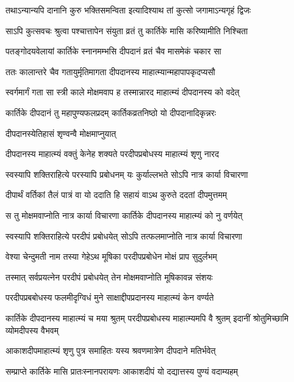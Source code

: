\twolineshloka
{तथाऽन्यान्यपि दानानि कुरु भक्तिसमन्विता}
{इत्यादिश्याथ तां कुत्सो जगामाऽन्यगृहं द्विजः} %

\twolineshloka
{साऽपि कुत्सवचः श्रुत्वा पश्चात्तापेन संयुता}
{व्रतं तु कार्तिके मासि करिष्यामीति निश्चिता} %

\twolineshloka
{पतङ्गोदयवेलायां कार्तिके स्नानमम्भसि}
{दीपदानं व्रतं चैव मासमेकं चकार सा} %

\twolineshloka
{ततः कालान्तरे चैव गतायुर्मृतिमागता}
{दीपदानस्य माहात्म्यान्महापापकृदप्यसौ} %

\twolineshloka
{स्वर्गमार्गं गता सा स्त्री काले मोक्षमवाप ह}
{तस्मान्नारद माहात्म्यं दीपदानस्य को वदेत्} %

\twolineshloka
{कार्तिके दीपदानं तु महापुण्यफलप्रदम्}
{कार्तिकव्रतनिष्ठो यो दीपदानादिकृन्नरः} %


\onelineshloka
{दीपदानस्येतिहासं शृण्वन्वै मोक्षमाप्नुयात्} %

\twolineshloka
{दीपदानस्य माहात्म्यं वक्तुं केनेह शक्यते}
{परदीपप्रबोधस्य माहात्म्यं शृणु नारद} %

\twolineshloka
{स्वस्यापि शक्तिराहित्ये परस्यापि प्रबोधनम्}
{यः कुर्याल्लभते सोऽपि नात्र कार्या विचारणा} %

\twolineshloka
{दीपार्थं वर्तिकां तैलं पात्रं वा यो ददाति हि}
{सहायं वाऽथ कुरुते ददतां दीपमुत्तमम्} %

\twolineshloka
{स तु मोक्षमवाप्नोति नात्र कार्या विचारणा}
{कार्तिके दीपदानस्य माहात्म्यं को नु वर्णयेत्} %

\twolineshloka
{स्वस्यापि शक्तिराहित्ये परदीपं प्रबोधयेत्}
{सोऽपि तत्फलमाप्नोति नात्र कार्या विचारणा} %

\twolineshloka
{वेश्या चेन्दुमती नाम तस्या गेहेऽथ मूषिका}
{परदीपप्रबोधेन मोक्षं प्राप सुदुर्लभम्} %

\twolineshloka
{तस्मात् सर्वप्रयत्नेन परदीपं प्रबोधयेत्}
{तेन मोक्षमवाप्नोति मूषिकावन्न संशयः} %

\twolineshloka
{परदीपप्रबबोधस्य फलमीदृग्विधं मुने}
{साक्षाद्दीपप्रदानस्य माहात्म्यं केन वर्ण्यते} %


\threelineshloka
{कार्तिके दीपदानस्य माहात्म्यं च मया श्रुतम्}
{परदीपप्रबोधस्य माहात्म्यमपि वै श्रुतम्}
{इदानीं श्रोतुमिच्छामि व्योमदीपस्य वैभवम्} %


\twolineshloka
{आकाशदीपमाहात्म्यं शृणु पुत्र समाहितः}
{यस्य श्रवणमात्रेण दीपदाने मतिर्भवेत्} %

\twolineshloka
{सम्प्राप्ते कार्तिके मासि प्रातःस्नानपरायणः}
{आकाशदीपं यो दद्यात्तस्य पुण्यं वदाम्यहम्} %

